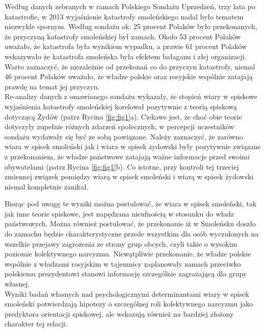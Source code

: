 \documentclass[man]{apa6}
\begin{document}
    Według danych zebranych w ramach Polskiego Sondażu Uprzedzeń, trzy lata po katastrofie, w 2013 wyjaśnienie katastrofy smoleńskiego nadal było tematem niezwykle spornym. Według sondażu \parencite[patrz,][]{soral2015socjo} ok. 25 procent Polaków było przekonanych, że przyczyną katastrofy smoleńskiej był zamach. Około 53 procent Polaków uważało, że katastrofa była wynikiem wypadku, a prawie 61 procent Polaków wskazywało że katastrofa smoleńska była efektem bałaganu i złej organizacji. Warto zaznaczyć, że niezależnie od przekonań co do przyczyn katastrofy, niemal 46 procent Polaków uważało, że władze polskie oraz rosyjskie wspólnie zatajają prawdę na temat jej przyczyn.\\
    Re-analizy danych z omawianego sondażu wykazały, że stopień wiary w spiskowe wyjaśnienia katastrofy smoleńskiej korelował pozytywnie z teorią spiskową dotyczącą Żydów (patrz Rycina \ref{fig:fig1}a). Ciekawe jest, że choć obie teorie dotyczyły zupełnie różnych zdarzeń społecznych, w percepcji uczestników sondażu wydawały się być ze sobą powiązane. Należy zaznaczyć, że zarówno wiara w spisek smoleński jak i wiara w spisek żydowski były pozytywnie związane z przekonaniem, że władze państwowe zatajają ważne informacje przed swoimi obywatelami (patrz Rycina \ref{fig:fig1}b). Co istotne, przy kontroli tej trzeciej zmiennej związek pomiędzy wiarą w spisek smoleński i wiarą w spisek żydowski niemal kompletnie zanikał.\\

	\begin{figure*}[htbp]
   		\centering
   		\caption{Związek pomiędzy wiarą w spisek smoleński a antysemityzmem spiskowym, bez -- a -- i przy kontroli -- b -- poziomu przekonania, że władze zatajają informacje przed obywatelami. \\ *$p$ < 0,05 **$p$ < 0,01 **$p$ < 0,001}
   		\label{fig:fig1}
	\end{figure*}

	Biorąc pod uwagę te wyniki można postulować, że wiara w spisek smoleński, tak jak inne teorie spiskowe, jest napędzana nieufnością w stosunku do władz państwowych. Można również postulować, że przekonanie iż w Smoleńsku doszło do zamachu będzie charakterystyczne przede wszystkim dla osób wyczulonych na wszelkie przejawy zagrożenia ze strony grup obcych, czyli takie o wysokim poziomie kolektywnego narcyzmu. Niewątpliwie przekonanie, że władze polskie wspólnie z władzami rosyjskim w tajemnicy zaplanowały zamach przeciwko polskiemu prezydentowi stanowi informację szczególnie zagrażającą dla grupy własnej.\\
	Wyniki badań własnych nad psychologicznymi determinantami wiary w spisek smoleński potwierdzają hipotezy o szczególnej roli kolektywnego narcyzmu jako predyktora orientacji spiskowej, ale wskazują również na bardziej złożony charakter tej relacji.
\end{document}
